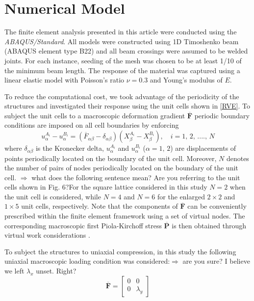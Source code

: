 \documentclass[10pt,twoside]{fernandes_supp}
\newcommand{\KB}[1]{\noindent\color{blue}$\Longrightarrow$ #1\normalcolor}
\begin{document}
\section{Numerical Model}
The finite element analysis presented in this article were conducted using the {\it ABAQUS/Standard}. All models were constructed using 1D Timoshenko beam  (ABAQUS element type B22) and all beam crossings were assumed to be welded joints. For each instance, seeding of the mesh was chosen to be at least 1/10 of the minimum beam length. The response of the material was captured using a linear elastic model with  Poisson's ratio $\nu=0.3$ and  Young's modulus of $E$.


To reduce the computational cost, we took advantage of the periodicity of the structures and investigated their response  using  the unit cells shown  in \cref{RVE}.
To subject the unit cells to a macroscopic deformation gradient $\overline{\mathbf{F}}$ periodic boundary conditions are imposed on all cell boundaries by enforcing  \citep{danielsson2002, bertoldi2008}
\begin{equation} \label{EQN:DefInfPeriodicFEM}
    u_\alpha^{A_i} -u_\alpha^{B_i} = (\overline{F}_{\alpha\beta}-\delta_{\alpha\beta})(X_\beta^{A_i}-X_\beta^{B_i}), \quad i=1,\,2,\,....,\,N
\end{equation}
where $\delta_{\alpha\beta}$ is the Kronecker delta, $u_\alpha^{A_i}$  and $u_\alpha^{B_i}$ ($\alpha=1,\,2$) are displacements of points periodically located on the boundary of the unit cell. Moreover, $N$ denotes the number of pairs of nodes periodically located on the boundary of the unit cell. \KB{what does the following sentence mean? Are you referring to the unit cells shown in Fig. 6?}For the square lattice considered in this study $N=2$ when the unit cell is considered, while $N=4$ and $N=6$ for the enlarged $2\times2$ and $1\times5$ unit cells, respectively. Note that  the components of $\overline{\mathbf{F}}$ can be conveniently prescribed within the finite element framework using a set of virtual nodes. The corresponding  macroscopic first Piola-Kirchoff stress $\overline{\mathbf{P}}$ is then obtained through virtual work considerations \citep{danielsson2002, bertoldi2008}. 

To subject the structures to uniaxial compression, in this study the following uniaxial macroscopic loading condition was considered:\KB{are you sure? I believe we left $\lambda_x$ unset. Right?} \begin{equation}
\overline{\mathbf{F}} = \begin{bmatrix}
0&0\\
0&\lambda_y
\end{bmatrix} 
\end{equation}
\end{document}
